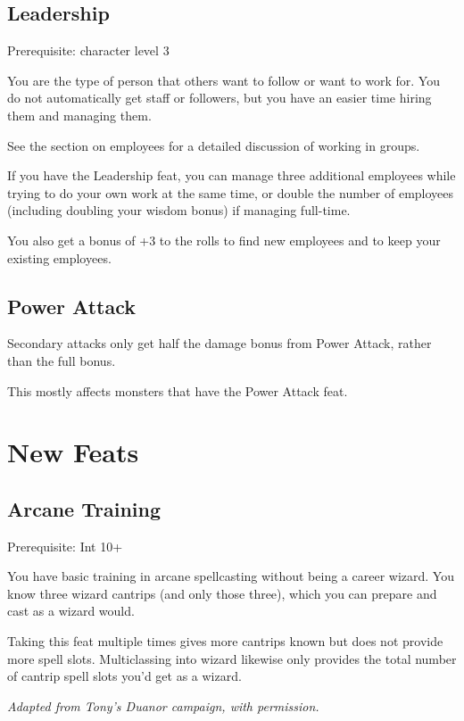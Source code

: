 %
\subsection{Leadership}

Prerequisite: character level 3

You are the type of person that others want to follow or want to work for.
You do not automatically get staff or followers, but you have an easier
time hiring them and managing them.

See the section on employees for a detailed discussion of working in groups.

If you have the Leadership feat, you can manage three additional employees
while trying to do your own work at the same time, or double the number
of employees (including doubling your wisdom bonus) if managing full-time.

You also get a bonus of +3 to the rolls to find new employees and to keep
your existing employees.
%

%
\subsection{Power Attack}

Secondary attacks only get half the damage bonus from Power Attack, rather
than the full bonus.

This mostly affects monsters that have the Power Attack feat.
%

%
%
\section{New Feats}

%
\subsection{Arcane Training}

Prerequisite: Int 10+

You have basic training in arcane spellcasting without being a career
wizard. You know three wizard cantrips (and only those three), which you
can prepare and cast as a wizard would.

Taking this feat multiple times gives more cantrips known but does not
provide more spell slots. Multiclassing into wizard likewise only provides
the total number of cantrip spell slots you'd get as a wizard.

\textit{Adapted from Tony's Duanor campaign, with permission.}
%

